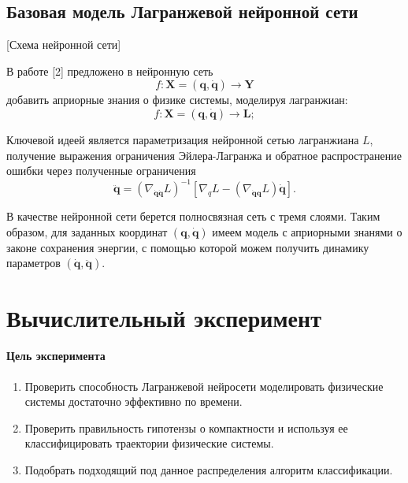 \documentclass[12pt, twoside]{article}
\begin{document}
\subsection{Базовая модель Лагранжевой нейронной сети}

[Схема нейронной сети]

В работе [2] предложено в нейронную сеть $$f: \mathbf{X} = (\mathbf{q}, \mathbf{\dot{q}}) \rightarrow \mathbf{Y}$$
 добавить априорные знания о физике системы, моделируя лагранжиан:
$$f: \mathbf{X} = (\mathbf{q}, \mathbf{\dot{q}}) \rightarrow \mathbf{L};$$

Ключевой идеей является параметризация нейронной сетью лагранжиана $L$, получение выражения ограничения Эйлера-Лагранжа и обратное распространение ошибки через полученные ограничения
$$\ddot{\mathbf{q}} =\left(\nabla_{\dot{\mathbf{q}} \dot{\mathbf{q}}} L\right)^{-1}\left[\nabla_{q} L-\left(\nabla_{\dot{\mathbf{q}}\mathbf{q}} L\right) \dot{\mathbf{q}}\right].$$ 

В качестве нейронной сети берется полносвязная сеть с тремя слоями. Таким образом, для заданных координат  $(\mathbf{q}, \mathbf{\dot{q}})$ имеем модель с априорными знанями о законе сохранения энергии, с помощью которой можем получить динамику параметров $(\mathbf{\dot{q}}, \mathbf{\ddot{q}})$.



\section{Вычислительный эксперимент}
\paragraph{Цель эксперимента}
 \begin{enumerate}
        \item Проверить способность Лагранжевой нейросети моделировать физические системы достаточно эффективно по времени.
        \item Проверить правильность гипотензы о компактности и используя ее классифицировать траектории физические системы.
        \item Подобрать подходящий под данное распределения алгоритм классификации.
\end{enumerate}
\end{document}
